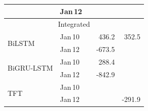 \documentclass[final,10pt,1p,authoryear]{elsarticle}
\theoremstyle{definition}
\begin{document}
\begin{table}[!htbp]
\begin{tabular}{l l r r r}
                            & Jan\,12 & \cellcolor{badcell}{5} & \cellcolor{goodcell}{90.8} & \cellcolor{badcell}{-1059.8} \\
\midrule
\multicolumn{5}{c}{{Integrated}} \\
\midrule
\multirow{2}{*}{BiLSTM}     & Jan\,10 & \cellcolor{goodcell}{1} & 436.2 & 352.5 \\
                            & Jan\,12 & \cellcolor{badcell}{6} & -673.5 & \cellcolor{badcell}{-3221.0} \\
\cmidrule{1-5}
\multirow{2}{*}{BiGRU-LSTM} & Jan\,10 & \cellcolor{goodcell}{1} & 288.4 & \cellcolor{goodcell}{175.8} \\
                            & Jan\,12 & \cellcolor{badcell}{6} & -842.9 & \cellcolor{badcell}{-3013.2} \\
\cmidrule{1-5}
\multirow{2}{*}{TFT}        & Jan\,10 & \cellcolor{goodcell}{0} & \cellcolor{goodcell}{-14.3} & \cellcolor{goodcell}{-14.3} \\
                            & Jan\,12 & \cellcolor{badcell}{4} & \cellcolor{goodcell}{-12.1} & -291.9 \\
\bottomrule
\end{tabular}
\end{table}
\end{document}
